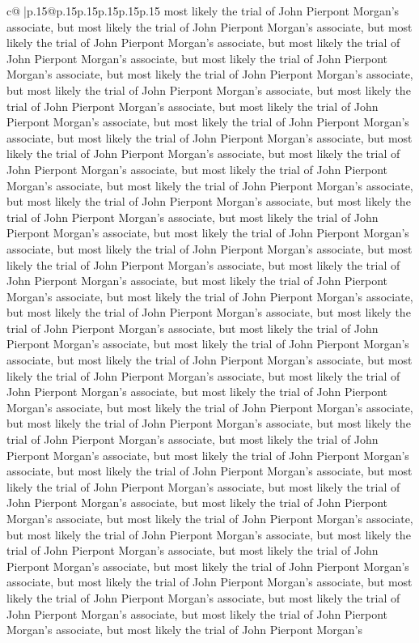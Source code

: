 \documentclass{article}
\begin{document}
{\begin{supertabular}{c@{$\;$}|p{.15\linewidth}@{}p{.15\linewidth}p{.15\linewidth}p{.15\linewidth}p{.15\linewidth}p{.15\linewidth}}
{{{most likely the trial of John Pierpont Morgan's associate, but most likely the trial of John Pierpont Morgan's associate, but most likely the trial of John Pierpont Morgan's associate, but most likely the trial of John Pierpont Morgan's associate, but most likely the trial of John Pierpont Morgan's associate, but most likely the trial of John Pierpont Morgan's associate, but most likely the trial of John Pierpont Morgan's associate, but most likely the trial of John Pierpont Morgan's associate, but most likely the trial of John Pierpont Morgan's associate, but most likely the trial of John Pierpont Morgan's associate, but most likely the trial of John Pierpont Morgan's associate, but most likely the trial of John Pierpont Morgan's associate, but most likely the trial of John Pierpont Morgan's associate, but most likely the trial of John Pierpont Morgan's associate, but most likely the trial of John Pierpont Morgan's associate, but most likely the trial of John Pierpont Morgan's associate, but most likely the trial of John Pierpont Morgan's associate, but most likely the trial of John Pierpont Morgan's associate, but most likely the trial of John Pierpont Morgan's associate, but most likely the trial of John Pierpont Morgan's associate, but most likely the trial of John Pierpont Morgan's associate, but most likely the trial of John Pierpont Morgan's associate, but most likely the trial of John Pierpont Morgan's associate, but most likely the trial of John Pierpont Morgan's associate, but most likely the trial of John Pierpont Morgan's associate, but most likely the trial of John Pierpont Morgan's associate, but most likely the trial of John Pierpont Morgan's associate, but most likely the trial of John Pierpont Morgan's associate, but most likely the trial of John Pierpont Morgan's associate, but most likely the trial of John Pierpont Morgan's associate, but most likely the trial of John Pierpont Morgan's associate, but most likely the trial of John Pierpont Morgan's associate, but most likely the trial of John Pierpont Morgan's associate, but most likely the trial of John Pierpont Morgan's associate, but most likely the trial of John Pierpont Morgan's associate, but most likely the trial of John Pierpont Morgan's associate, but most likely the trial of John Pierpont Morgan's associate, but most likely the trial of John Pierpont Morgan's associate, but most likely the trial of John Pierpont Morgan's associate, but most likely the trial of John Pierpont Morgan's associate, but most likely the trial of John Pierpont Morgan's associate, but most likely the trial of John Pierpont Morgan's associate, but most likely the trial of John Pierpont Morgan's associate, but most likely the trial of John Pierpont Morgan's associate, but most likely the trial of John Pierpont Morgan's associate, but most likely the trial of John Pierpont Morgan's associate, but most likely the trial of John Pierpont Morgan's associate, but most likely the trial of John Pierpont Morgan's associate, but most likely the trial of John Pierpont Morgan's associate, but most likely the trial of John Pierpont Morgan's associate, but most likely the trial of John Pierpont Morgan's }}}
\end{supertabular}}
\end{document}
